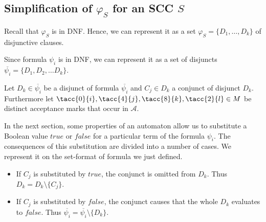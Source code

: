 \documentclass[runningheads]{llncs}
\def\false{\mathit{false}}
\def\true{\mathit{true}}
\begin{document}

\subsection{Simplification of $\varphi_S$ for an SCC $S$}\label{ssec:step1}
Recall that $\varphi_S$ is in DNF. Hence, we can represent it as a set
$\varphi_S=\{D_1,\ldots,D_k\}$ of disjunctive clauses.





Since formula $\psi_{i}$ is in DNF, we can represent it as a set of disjuncts $\overline{\psi_{i}} = \{D_1, D_2, \ldots D_k\}$.

Let $D_{k} \in \overline{\psi_{i}}$ be a disjunct of formula $\overline{\psi_{i}}$ and $C_{j} \in D_{k}$ a conjunct of disjunct $D_{k}$. Furthermore let  $\tacc{0}{i}, \tacc{4}{j}, \tacc{8}{k}, \tacc{2}{l} \in M$ be distinct acceptance marks that occur in $\mathcal{A}$.

In the next section, some properties of an automaton allow us to substitute a Boolean value $\true$ or $\false$ for a particular term of the formula $\psi_i$.
The consequences of this substitution are divided into a number of cases. We represent it on the set-format of formula we just defined.

\begin{itemize}
    \item If $C_{j}$ is substituted by $\true$, the conjunct is omitted from $D_{k}$. Thus $D_{k} = D_{k} \setminus \{C_{j}\}$.
    \item If $C_{j}$ is substituted by $\false$, the conjunct causes that the whole $D_{k}$ evaluates to $\false$. Thus $\overline{\psi_{i}} = \overline{\psi_{i}} \setminus \{D_{k}\}$.

\end{itemize}
\end{document}
